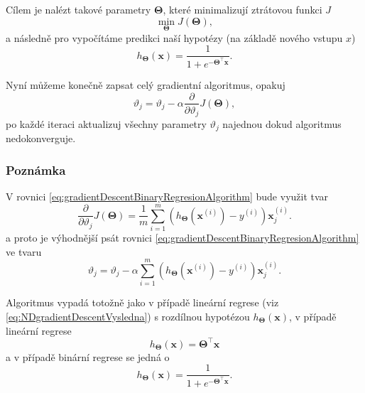 \par{Cílem je nalézt takové parametry $\bm{\Theta}$, které minimalizují ztrátovou funkci $J$
\begin{equation}
	\min_{\bm{\Theta}} J \left( \bm{\Theta} \right),
\end{equation}
a následně pro vypočítáme predikci naší hypotézy (na základě nového vstupu $x$) 
\begin{equation}
	h_{\bm{\Theta}} \left( \bm{x} \right) = \frac{1}{1 + e^{ - \bm{\Theta}^{\top} \bm{x}}}.
\end{equation}}

\par{Nyní můžeme konečně zapsat celý gradientní algoritmus, opakuj
\begin{equation}
	\vartheta_j = \vartheta_j - \alpha \frac{\partial}{\partial \vartheta_j} J \left( \bm{\Theta} \right),
	\label{eq:gradientDescentBinaryRegresionAlgorithm}
\end{equation}
po každé iteraci aktualizuj všechny parametry $\vartheta_j$ najednou dokud algoritmus nedokonverguje.}

\subsubsection*{Poznámka}
\par{V rovnici \ref{eq:gradientDescentBinaryRegresionAlgorithm} bude využit tvar
\begin{equation}
	\frac{\partial}{\partial \vartheta_j} J \left( \bm{\Theta} \right) = \frac{1}{m} \sum_{i = 1}^{m} \left( h_{\bm{\Theta}} \left( \bm{x}^{\left( i \right)} \right) - y^{\left( i \right)} \right) \bm{x}_j^{\left( i \right)}.
\end{equation} a proto je výhodnější psát rovnici \ref{eq:gradientDescentBinaryRegresionAlgorithm} ve tvaru
\begin{equation}
		\vartheta_j = \vartheta_j - \alpha \sum_{i = 1}^{m} \left( h_{\bm{\Theta}} \left( \bm{x}^{\left( i \right)} \right) - y^{\left( i \right)} \right) \bm{x}_j^{\left( i \right)}.
\end{equation}}

\par{Algoritmus vypadá totožně jako v případě lineární regrese (viz \ref{eq:NDgradientDescentVysledna}) s rozdílnou hypotézou $h_{\bm{\Theta}} \left( \bm{x} \right)$, v případě lineární regrese
\begin{equation}
	h_{\bm{\Theta}} \left( \bm{x} \right) = \bm{\Theta}^{\top} \bm{x}
\end{equation}
a v případě binární regrese se jedná o
\begin{equation}
	h_{\bm{\Theta}} \left( \bm{x} \right) = \frac{1}{1 + e^{- \bm{\Theta}^{\top} \bm{x}}}.
\end{equation}}

